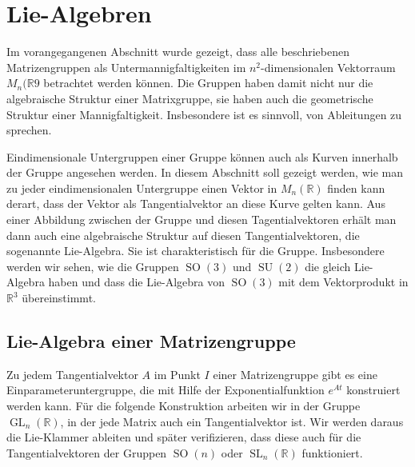%
%
%
\section{Lie-Algebren
\label{buch:section:lie-algebren}}
Im vorangegangenen Abschnitt wurde gezeigt, dass alle beschriebenen
Matrizengruppen als Untermannigfaltigkeiten im $n^2$-dimensionalen
Vektorraum $M_n(\mathbb{R}9$ betrachtet werden können.
Die Gruppen haben damit nicht nur die algebraische Struktur einer
Matrixgruppe, sie haben auch die geometrische Struktur einer 
Mannigfaltigkeit.
Insbesondere ist es sinnvoll, von Ableitungen zu sprechen.

Eindimensionale Untergruppen einer Gruppe können auch als Kurven
innerhalb der Gruppe angesehen werden.
In diesem Abschnitt soll gezeigt werden, wie man zu jeder eindimensionalen
Untergruppe einen Vektor in $M_n(\mathbb{R})$ finden kann derart, dass
der Vektor als Tangentialvektor an diese Kurve gelten kann.
Aus einer Abbildung zwischen der Gruppe und diesen Tagentialvektoren
erhält man dann auch eine algebraische Struktur auf diesen Tangentialvektoren,
die sogenannte Lie-Algebra.
Sie ist charakteristisch für die Gruppe.
Insbesondere werden wir sehen, wie die Gruppen $\operatorname{SO}(3)$ 
und $\operatorname{SU}(2)$ die gleich Lie-Algebra haben und dass die
Lie-Algebra von $\operatorname{SO}(3)$ mit dem Vektorprodukt in $\mathbb{R}^3$
übereinstimmt.

%
%
\subsection{Lie-Algebra einer Matrizengruppe
\label{buch:section:lie-algebra-einer-matrizengruppe}}
Zu jedem Tangentialvektor $A$ im Punkt $I$ einer Matrizengruppe gibt es
eine Einparameteruntergruppe, die mit Hilfe der Exponentialfunktion
$e^{At}$ konstruiert werden kann.
Für die folgende Konstruktion arbeiten wir in der Gruppe
$\operatorname{GL}_n(\mathbb{R})$, in der jede Matrix auch ein
Tangentialvektor ist.
Wir werden daraus die Lie-Klammer ableiten und später verifizieren,
dass diese auch für die Tangentialvektoren der Gruppen
$\operatorname{SO}(n)$ oder $\operatorname{SL}_n(\mathbb{R})$ funktioniert.

